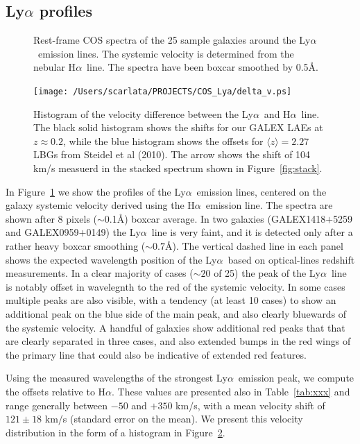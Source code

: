 \documentclass[manuscript]{emulateapj}
\newcommand{\lya}{Ly$\alpha$}
\newcommand{\ha}{H$\alpha$}
\begin{document}
\subsection{Ly$\alpha$ profiles}

\begin{figure}[h!]
   \centering
   \caption{Rest-frame COS spectra of the 25 sample galaxies around the \lya\
     emission lines. The systemic velocity is determined from the
     nebular \ha\ line. The spectra have been boxcar smoothed by 0.5\AA. }
  \label{fig:spectra_lya}
\end{figure}


\begin{figure}[h!]
   \centering
   \texttt{[image: /Users/scarlata/PROJECTS/COS\_Lya/delta\_v.ps]}
   \caption{Histogram of the velocity difference between the \lya\ and
     \ha\ line. The black solid histogram shows the shifts for our
     GALEX LAEs at $z\approx 0.2$, while the blue histogram shows the
     offsets for $\langle z \rangle=2.27$ LBGs from Steidel et al
     (2010). The arrow shows the shift of 104 km/s measuerd in the
     stacked spectrum shown in Figure~\ref{fig:stack}.}
   \label{fig:histvel}
\end{figure}

In Figure~\ref{fig:spectra_lya} we show the profiles of the \lya\
emission lines, centered on the galaxy systemic velocity derived using
the \ha\ emission line. The spectra are shown after 8 pixels ($\sim
$0.1\AA) boxcar average. In two galaxies (GALEX1418$+$5259 and
GALEX0959$+$0149) the \lya\ line is very faint, and it is detected
only after a rather heavy boxcar smoothing ($\sim 0.7$\AA).  The
vertical dashed line in each panel shows the expected wavelength
position of the \lya\ based on optical-lines redshift measurements.
In a clear majority of cases ($\sim 20$ of 25) the peak of the \lya\
line is notably offset in wavelegnth to the red of the systemic
velocity. In some cases multiple peaks are also visible, with a
tendency (at least 10 cases) to show an additional peak on the blue
side of the main peak, and also clearly bluewards of the systemic
velocity. A handful of galaxies show additional red peaks that that
are clearly separated in three cases, and also extended bumps in the
red wings of the primary line that could also be indicative of
extended red features.

Using the measured wavelengths of the strongest \lya\ emission peak,
we compute the offsets relative to \ha. These values are presented
also in Table~\ref{tab:xxx} and range generally between $-50$ and
$+350$ km/s, with a mean velocity shift of $121\pm 18$ km/s (standard
error on the mean). We present this velocity distribution in the form
of a histogram in Figure~\ref{fig:histvel}.
\end{document}

